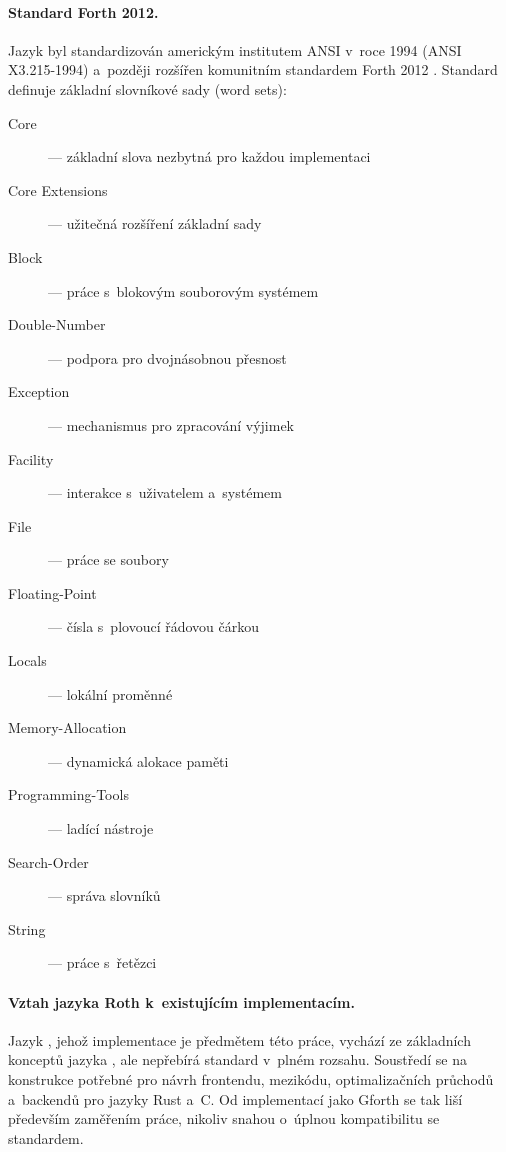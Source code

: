 \paragraph{Standard Forth 2012.}
Jazyk \Forth{} byl standardizován americkým institutem ANSI v~roce 1994
(ANSI X3.215-1994) a~později rozšířen komunitním standardem Forth 2012
\autocite{forth-standard}. Standard definuje základní slovníkové sady
(word sets):

\begin{description}
	\item[Core] --- základní slova nezbytná pro každou implementaci
	\item[Core Extensions] --- užitečná rozšíření základní sady
	\item[Block] --- práce s~blokovým souborovým systémem
	\item[Double-Number] --- podpora pro dvojnásobnou přesnost
	\item[Exception] --- mechanismus pro zpracování výjimek
	\item[Facility] --- interakce s~uživatelem a~systémem
	\item[File] --- práce se soubory
	\item[Floating-Point] --- čísla s~plovoucí řádovou čárkou
	\item[Locals] --- lokální proměnné
	\item[Memory-Allocation] --- dynamická alokace paměti
	\item[Programming-Tools] --- ladící nástroje
	\item[Search-Order] --- správa slovníků
	\item[String] --- práce s~řetězci
\end{description}

\paragraph{Vztah jazyka Roth k~existujícím implementacím.}
Jazyk \Roth{}, jehož implementace je předmětem této práce, vychází
ze základních konceptů jazyka \Forth{}, ale nepřebírá standard v~plném
rozsahu. Soustředí se na konstrukce potřebné pro návrh frontendu,
mezikódu, optimalizačních průchodů a~backendů pro jazyky Rust a~C.
Od implementací jako Gforth se tak liší především zaměřením práce,
nikoliv snahou o~úplnou kompatibilitu se standardem.
